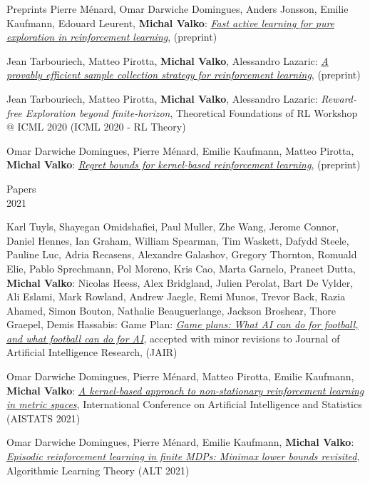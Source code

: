 \documentclass{resume}
\begin{document}
\begin{category}{Preprints}
\citembullet
Pierre M\' enard,  Omar Darwiche Domingues, Anders Jonsson,  Emilie Kaufmann, Edouard Leurent, {\bf Michal Valko}:
\href{http://arxiv.org/abs/2007.13442.pdf}{\emph{Fast active learning for pure exploration in reinforcement learning}},
({\sf preprint}) 

\citembullet
Jean Tarbouriech, Matteo Pirotta, {\bf Michal Valko}, Alessandro Lazaric:
\href{http://arxiv.org/abs/2007.06437.pdf}
{\emph{A provably efficient sample collection strategy for reinforcement learning}},
({\sf preprint}) 

\citembullet
Jean Tarbouriech, Matteo Pirotta, {\bf Michal Valko}, Alessandro Lazaric:
{\emph{Reward-free Exploration beyond finite-horizon}},
Theoretical Foundations of RL Workshop @ ICML 2020
({\sf ICML 2020 - RL Theory}) 


\citembullet
Omar Darwiche Domingues, Pierre M\'enard, Emilie Kaufmann, Matteo Pirotta, {\bf Michal Valko}:
\href{https://arxiv.org/abs/2004.05599}{\emph{Regret bounds for kernel-based reinforcement learning}},
({\sf preprint}) 


\begin{category}{Papers\\2021}

\citembullet
Karl Tuyls, Shayegan Omidshafiei, Paul Muller, Zhe Wang, Jerome Connor, Daniel Hennes, Ian Graham, William Spearman, Tim Waskett, Dafydd Steele, Pauline Luc, Adria Recasens, Alexandre Galashov, Gregory Thornton, Romuald Elie, Pablo Sprechmann, Pol Moreno, Kris Cao, Marta Garnelo, Praneet Dutta, {\bf Michal Valko}: Nicolas Heess, Alex Bridgland, Julien Perolat, Bart De Vylder, Ali Eslami, Mark Rowland, Andrew Jaegle, Remi Munos, Trevor Back, Razia Ahamed, Simon Bouton, Nathalie Beauguerlange, Jackson Broshear, Thore Graepel, Demis Hassabis: Game Plan: 
\href{https://arxiv.org/pdf/2011.09192.pdf}{\emph{Game plans: What AI can do for football, and what football can do for AI}},
accepted with minor revisions to Journal of Artificial Intelligence Research,
({\sf JAIR}) 


\citembullet
Omar Darwiche Domingues, Pierre M\'enard,  Matteo Pirotta, Emilie Kaufmann, {\bf Michal Valko}:
\href{https://arxiv.org/pdf/2007.05078.pdf}
{\emph{A kernel-based approach to non-stationary reinforcement learning in metric spaces}},
International Conference on Artificial Intelligence and Statistics
({\sf AISTATS 2021}) 


\citembullet
Omar Darwiche Domingues, Pierre M\'enard,  Emilie Kaufmann, {\bf Michal Valko}:
\href{https://arxiv.org/pdf/2010.03531.pdf}
{\emph{Episodic reinforcement learning in finite MDPs: Minimax lower bounds revisited}},
Algorithmic Learning Theory
({\sf ALT 2021}) 


\end{category}
\end{category}
\end{document}

